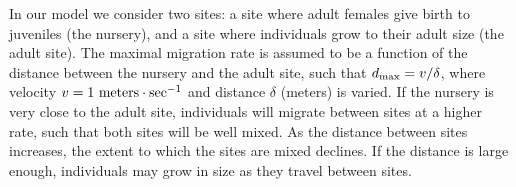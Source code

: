 \documentclass[]{rsos}%
\begin{document}
 
 


In our model we consider two sites: a site where adult females give birth to juveniles (the nursery), and a site where individuals grow to their adult size (the adult site).
The maximal migration rate is assumed to be a function of the distance between the nursery and the adult site, such that $d_{\rm max} = v/\delta$, where velocity $v=1~{\rm meters}\cdot {\rm sec}^{-1}$ and distance $\delta$ (meters) is varied. 
If the nursery is very close to the adult site, individuals will migrate between sites at a higher rate, such that both sites will be well mixed.
As the distance between sites increases, the extent to which the sites are mixed declines.
If the distance is large enough, individuals may grow in size as they travel between sites.
\end{document}
